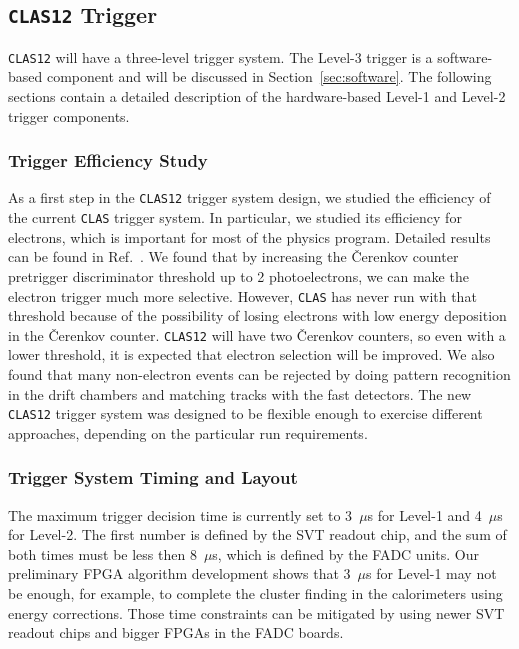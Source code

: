 \subsection{{\tt CLAS12} Trigger}

{\tt CLAS12} will have a three-level trigger system.  The Level-3 trigger 
is a software-based component and will be discussed in Section~\ref{sec:software}.  
The following sections contain a detailed description of the hardware-based 
Level-1 and Level-2 trigger components.

\subsubsection{Trigger Efficiency Study}

As a first step in the {\tt CLAS12} trigger system design, we studied the
efficiency of the current {\tt CLAS} trigger system.  In particular, we
studied its efficiency for electrons, which is important for most of the
physics program.  Detailed results can be found in Ref.~\cite{mikh}.
We found that by increasing the {\v C}erenkov counter pretrigger 
discriminator threshold up to 2 photoelectrons, we can make the electron 
trigger much more selective.  However, {\tt CLAS} has never run with that 
threshold because of the possibility of losing electrons with low energy 
deposition in the {\v C}erenkov counter.  {\tt CLAS12} will have two 
{\v C}erenkov counters, so even with a lower threshold, it is expected that
electron selection will be improved.  We also found that many non-electron 
events can be rejected by doing pattern recognition in the drift chambers 
and matching tracks with the fast detectors.  The new {\tt CLAS12} trigger 
system was designed to be flexible enough to exercise different approaches, 
depending on the particular run requirements.

\subsubsection{Trigger System Timing and Layout}

The maximum trigger decision time is currently set to 3~$\mu$s for Level-1
and 4~$\mu$s for Level-2.  The first number is defined by the SVT readout
chip, and the sum of both times must be less then 8~$\mu$s, which is defined 
by the FADC units.  Our preliminary FPGA algorithm development shows that 
3~$\mu$s for Level-1 may not be enough, for example, to complete the cluster 
finding in the calorimeters using energy corrections.  Those time constraints 
can be mitigated by using newer SVT readout chips and bigger FPGAs in the FADC
boards.

